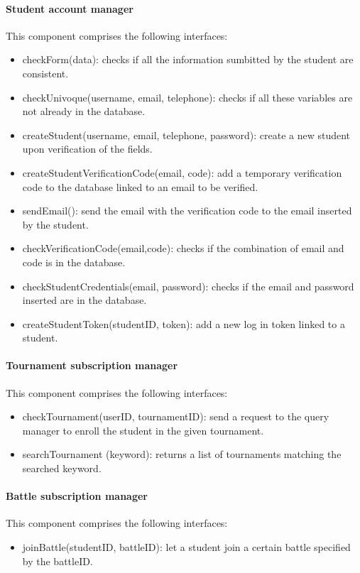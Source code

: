 \documentclass[12pt, a4paper]{report}
\begin{document}
    \paragraph*{Student account manager}
    This component comprises the following interfaces: 
    \begin{itemize}
        \item checkForm(data): checks if all the information sumbitted by the student are consistent. 
        \item checkUnivoque(username, email, telephone): checks if all these variables are not already in the database. 
        \item createStudent(username, email, telephone, password): create a new student upon verification of the fields. 
        \item createStudentVerificationCode(email, code): add a temporary verification code to the database linked to an email to be verified. 
        \item sendEmail(): send the email with the verification code to the email inserted by the student. 
        \item checkVerificationCode(email,code): checks if the combination of email and code is in the database. 
        \item checkStudentCredentials(email, password): checks if the email and password inserted are in the database. 
        \item createStudentToken(studentID, token): add a new log in token linked to a student. 
    \end{itemize}

    \paragraph*{Tournament subscription manager}
    This component comprises the following interfaces: 
    \begin{itemize}
        \item checkTournament(userID, tournamentID): send a request to the query manager to enroll the student in the given tournament. 
        \item searchTournament (keyword): returns a list of tournaments matching the searched keyword. 
    \end{itemize}

    \paragraph*{Battle subscription manager}
    This component comprises the following interfaces: 
    \begin{itemize}
        \item joinBattle(studentID, battleID): let a student join a certain battle specified by the battleID.
    \end{itemize}
\end{document}
